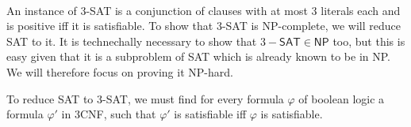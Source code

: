 \begin{example}\ \\
    \label{ex:3sat-npc}
    An instance of 3-\textsf{SAT} is a conjunction of clauses with at most 3 literals each and is positive iff it is satisfiable. To show that 3-\textsf{SAT} is \textsf{NP}-complete, we will reduce \textsf{SAT} to it. It is technechally necessary to show that \(3-\textsf{SAT}\in\textsf{NP}\) too, but this is easy given that it is a subproblem of \textsf{SAT} which is already known to be in \textsf{NP}. We will therefore focus on proving it \textsf{NP}-hard.

    To reduce \textsf{SAT} to 3-\textsf{SAT}, we must find for every formula \(\varphi\) of boolean logic a formula \(\varphi'\) in 3CNF, such that \(\varphi'\) is satisfiable iff \(\varphi\) is satisfiable.
\end{example}

